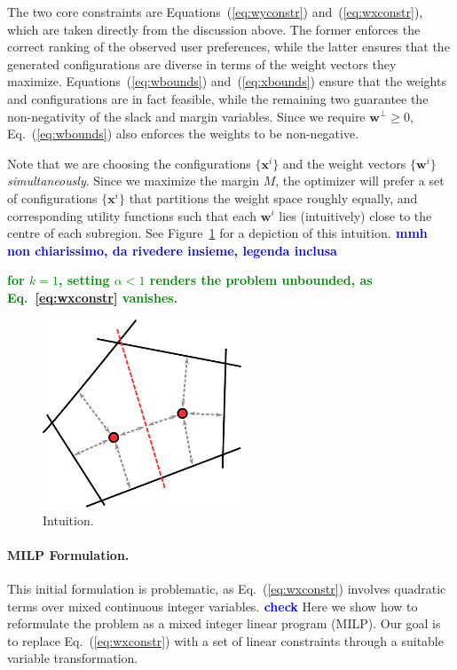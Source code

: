 \documentclass{article}
\renewcommand\[{\begin{equation}}
\renewcommand\]{\end{equation}}
\newcommand{\vecvar}[1]{\ensuremath{\boldsymbol{#1}}}
\newcommand{\vw}{\vecvar{w}}
\newcommand{\vx}{\vecvar{x}}
\newcommand{\andrea}[1]{{\bf \textcolor{blue}{{\fbox{Andrea:} #1}}}}
\newcommand{\stefano}[1]{{\bf \textcolor{green}{{\fbox{Stefano:} #1}}}}
\begin{document}
The two core constraints are Equations~(\ref{eq:wyconstr}) and~(\ref{eq:wxconstr}),
which are taken directly from the discussion above. The former enforces the
correct ranking of the observed user preferences, while the latter ensures that
the generated configurations are diverse in terms of the weight vectors they
maximize. Equations~(\ref{eq:wbounds}) and~(\ref{eq:xbounds})
ensure that the weights and configurations are in fact feasible, while the
remaining two guarantee the non-negativity of the slack and margin variables.
Since we require $\vw^\bot \ge 0$, Eq.~(\ref{eq:wbounds}) also enforces the
weights to be non-negative.

Note that we are choosing the configurations $\{ \vx^i \}$ and the weight vectors $\{
\vw^i \}$ {\em simultaneously}. Since we maximize the margin $M$, the optimizer
will prefer a set of configurations $\{ \vx^{i} \}$ that partitions the weight space
roughly equally, and corresponding utility functions such that each $\vw^{i}$
lies (intuitively) close to the centre of each subregion. See
Figure~\ref{fig:setmargin} for a depiction of this intuition.\andrea{mmh non chiarissimo, da rivedere insieme, legenda inclusa}

\stefano{for $k=1$, setting $\alpha < 1$  renders the problem unbounded, as
Eq.~\ref{eq:wxconstr} vanishes.}

\begin{figure}[t]
    \begin{center}
        \includegraphics[width=16em]{figures/setmargin}
    \end{center}
    \caption{\label{fig:setmargin} Intuition.}
\end{figure}

\paragraph{MILP Formulation.} This initial formulation is problematic,
as Eq.~(\ref{eq:wxconstr}) involves quadratic terms over mixed
continuous integer variables.\andrea{check} Here we show how to reformulate the
problem as a mixed integer linear program (MILP). Our goal is to
replace Eq.~(\ref{eq:wxconstr}) with a set of linear constraints through
a suitable variable transformation.
\end{document}
